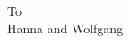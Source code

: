 \addchap{}
\begin{refsection}

\vspace*{2in}
\begin{center}To \\ Hanna and Wolfgang
\end{center}

\printbibliography[heading=subbibliography]
\end{refsection}